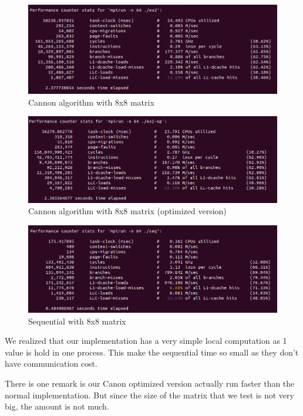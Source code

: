 \documentclass{article}
\begin{document}
\begin{figure}[H]
	\includegraphics[width=\textwidth]{ex2.png}
	\caption{Cannon algorithm with 8x8 matrix}
\end{figure}

\begin{figure}[H]
	\includegraphics[width=\textwidth]{ex2-op.png}
	\caption{Cannon algorithm with 8x8 matrix (optimized version)}
\end{figure}

\begin{figure}[H]
	\includegraphics[width=\textwidth]{seq.png}
	\caption{Sequential with 8x8 matrix}
\end{figure}

We realized that our implementation has a very simple local computation as 1 value is hold in one process. This make the sequential time so small as they don't have communication cost.

There is one remark is our Canon optimized version actually run faster than the normal implementation. But since the size of the matrix that we test is not very big, the amount is not much.
\end{document}
